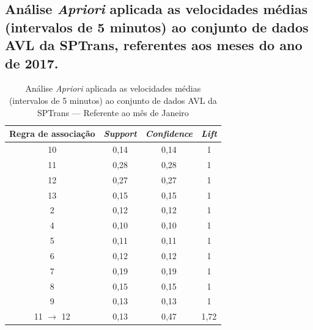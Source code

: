 \documentclass[
	12pt,				%
	oneside,			%
	a4paper,			%
	english,			%
	brazil				%
	]{abntex2ppgsi}
\begin{document}
{{\begin{apendicesenv}
\section{Análise \textit{Apriori} aplicada as velocidades médias (intervalos de 5 minutos) ao conjunto de dados AVL da SPTrans, referentes aos meses do ano de 2017.}
\label{g1}

\begin{table}[!htb]
\centering
\caption {Análise \textit{Apriori} aplicada as velocidades médias (intervalos de 5 minutos) ao conjunto de dados AVL da SPTrans --- Referente ao mês de Janeiro}
\label {tab:aprioriJanuary}
\begin{tabular}{c|c|c|c}
\toprule
\textbf{Regra de associação} & \textit{\textbf{Support}} & \textit{\textbf{Confidence}} & \textit{\textbf{Lift}} \\
\midrule
10 &  0,14 &  0,14 &  1\\
\hline
11 &  0,28 &  0,28 &  1\\
\hline
12 &  0,27 &  0,27 &  1\\
\hline
13 &  0,15 &  0,15 &  1\\
\hline
2 &  0,12 &  0,12&  1\\
\hline
4 &  0,10&  0,10 &  1\\
\hline
5 &  0,11 &  0,11 &  1\\
\hline
6 &  0,12 &  0,12 &  1\\
\hline
7 &  0,19 &  0,19 &  1\\
\hline
8 &  0,15 &  0,15&  1\\
\hline
9 &  0,13 &  0,13 &  1\\
\hline
11 $\rightarrow$ 12 &  0,13 &  0,47&  1,72\\
\bottomrule
\end{tabular}
\end{table}


\end{apendicesenv}}}
\end{document}
